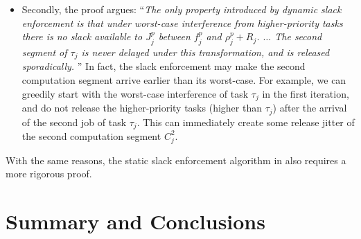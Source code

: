 \begin{itemize}
\begin{itemize}
  \item Secondly, the proof argues: ``\emph{The only property
      introduced by dynamic slack enforcement is that under worst-case
      interference from higher-priority tasks there is no slack
      available to $J_j^p$ between $f_j^p$ and $\rho_j^p + R_j$.
      $\ldots$ The second segment of $\tau_j$ is never delayed under
      this transformation, and is released sporadically.} '' In fact,
    the slack enforcement may make the second computation segment
    arrive earlier than its worst-case. For example, we can greedily
    start with the worst-case interference of task $\tau_j$ in the
    first iteration, and do not release the higher-priority tasks
    (higher than $\tau_j$) after the arrival of the second job of task
    $\tau_j$. This can immediately create some release jitter of the
    second computation segment $C_j^2$.
  \end{itemize}
  With the same reasons, the static slack enforcement algorithm in
  \cite{LR:rtas10} also requires a more rigorous proof.
\end{itemize}




\section{Summary and Conclusions}
  
